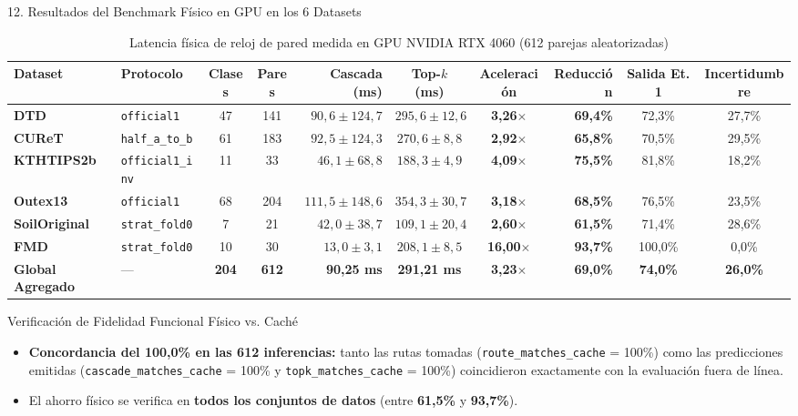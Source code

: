 \documentclass[aspectratio=169,10pt]{beamer}
\begin{document}
\begin{frame}{12. Resultados del Benchmark Físico en GPU en los 6 Datasets}
\begin{table}
\centering
\scriptsize
\caption{Latencia física de reloj de pared medida en GPU NVIDIA RTX 4060 (612 parejas aleatorizadas)}
\begin{tabular}{@{}llccrccrcc@{}}
\toprule
Dataset & Protocolo & Clases & Pares & Cascada (ms) & Top-$k$ (ms) & Aceleración & Reducción & Salida Et. 1 & Incertidumbre \\
\midrule
\textbf{DTD} & \texttt{official1} & 47 & 141 & $90{,}6 \pm 124{,}7$ & $295{,}6 \pm 12{,}6$ & \textbf{3,26$\times$} & \textbf{69,4\%} & 72,3\% & 27,7\% \\
\textbf{CUReT} & \texttt{half\_a\_to\_b} & 61 & 183 & $92{,}5 \pm 124{,}3$ & $270{,}6 \pm 8{,}8$ & \textbf{2,92$\times$} & \textbf{65,8\%} & 70,5\% & 29,5\% \\
\textbf{KTHTIPS2b} & \texttt{official1\_inv} & 11 & 33 & $46{,}1 \pm 68{,}8$ & $188{,}3 \pm 4{,}9$ & \textbf{4,09$\times$} & \textbf{75,5\%} & 81,8\% & 18,2\% \\
\textbf{Outex13} & \texttt{official1} & 68 & 204 & $111{,}5 \pm 148{,}6$ & $354{,}3 \pm 30{,}7$ & \textbf{3,18$\times$} & \textbf{68,5\%} & 76,5\% & 23,5\% \\
\textbf{SoilOriginal} & \texttt{strat\_fold0} & 7 & 21 & $42{,}0 \pm 38{,}7$ & $109{,}1 \pm 20{,}4$ & \textbf{2,60$\times$} & \textbf{61,5\%} & 71,4\% & 28,6\% \\
\textbf{FMD} & \texttt{strat\_fold0} & 10 & 30 & $13{,}0 \pm 3{,}1$ & $208{,}1 \pm 8{,}5$ & \textbf{16,00$\times$} & \textbf{93,7\%} & 100,0\% & 0,0\% \\
\midrule
\textbf{Global Agregado} & — & \textbf{204} & \textbf{612} & \textbf{90,25 ms} & \textbf{291,21 ms} & \textbf{3,23$\times$} & \textbf{69,0\%} & \textbf{74,0\%} & \textbf{26,0\%} \\
\bottomrule
\end{tabular}
\end{table}
\vspace{-0.4em}
\begin{exampleblock}{\scriptsize Verificación de Fidelidad Funcional Físico vs. Caché}
\scriptsize
\begin{itemize}
\item \textbf{Concordancia del 100,0\% en las 612 inferencias:} tanto las rutas tomadas (\texttt{route\_matches\_cache} = 100\%) como las predicciones emitidas (\texttt{cascade\_matches\_cache} = 100\% y \texttt{topk\_matches\_cache} = 100\%) coincidieron exactamente con la evaluación fuera de línea.
\item El ahorro físico se verifica en \textbf{todos los conjuntos de datos} (entre \textbf{61,5\%} y \textbf{93,7\%}).
\end{itemize}
\end{exampleblock}
\end{frame}
\end{document}
